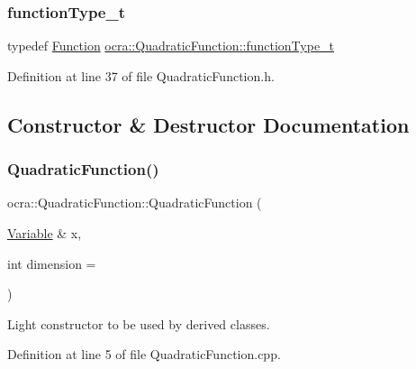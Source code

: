 \subsubsection{\texorpdfstring{function\+Type\+\_\+t}{functionType\_t}}
{\footnotesize\ttfamily typedef \hyperlink{classocra_1_1Function}{Function} \hyperlink{classocra_1_1QuadraticFunction_a224eecd300c5a16599ebd6e4eff5d9d7}{ocra\+::\+Quadratic\+Function\+::function\+Type\+\_\+t}}



Definition at line 37 of file Quadratic\+Function.\+h.



\subsection{Constructor \& Destructor Documentation}
\hypertarget{classocra_1_1QuadraticFunction_ac5792908a2b7cfdaf612c1e809100a5e}{}\label{classocra_1_1QuadraticFunction_ac5792908a2b7cfdaf612c1e809100a5e} 
\subsubsection{\texorpdfstring{Quadratic\+Function()}{QuadraticFunction()}\hspace{0.1cm}{\footnotesize\ttfamily [1/2]}}
{\footnotesize\ttfamily ocra\+::\+Quadratic\+Function\+::\+Quadratic\+Function (\begin{DoxyParamCaption}\item[{\hyperlink{classocra_1_1Variable}{Variable} \&}]{x,  }\item[{int}]{dimension = {} }\end{DoxyParamCaption})\hspace{0.3cm}{\ttfamily [protected]}}

Light constructor to be used by derived classes. 

Definition at line 5 of file Quadratic\+Function.\+cpp.

\hypertarget{classocra_1_1QuadraticFunction_a9955f993dd22831561b3b67767f72a0d}{}\label{classocra_1_1QuadraticFunction_a9955f993dd22831561b3b67767f72a0d} 
